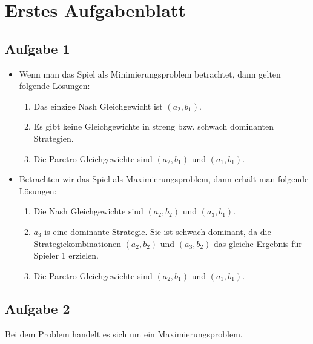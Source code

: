 
\section*{Erstes Aufgabenblatt}
\subsection*{Aufgabe 1}
\label{sec:Aufgabe 1}
\begin{itemize}
	\item Wenn man das Spiel als Minimierungsproblem betrachtet, dann gelten folgende Lösungen:

		\begin{enumerate}[label=\alph{enumi})]
			\item Das einzige Nash Gleichgewicht ist $(a_2, b_1)$.
			\item Es gibt keine Gleichgewichte in streng bzw. schwach dominanten Strategien.
			\item Die Paretro Gleichgewichte sind $(a_2, b_1)$ und $(a_1, b_1)$.
		\end{enumerate}

	\item Betrachten wir das Spiel als Maximierungsproblem, dann erhält man folgende Lösungen:

		\begin{enumerate}[label=\alph{enumi})]
			\item Die Nash Gleichgewichte sind $(a_2, b_2)$ und $(a_3, b_1)$.
			\item $a_3$ is eine dominante Strategie. Sie ist schwach dominant, da die Strategiekombinationen
				$(a_2, b_2)$ und $(a_3, b_2)$ das gleiche Ergebnis für Spieler 1 erzielen.
			\item Die Paretro Gleichgewichte sind $(a_2, b_1)$ und $(a_1, b_1)$.
		\end{enumerate}
\end{itemize}

\subsection{Aufgabe 2}
\label{sec:Aufgabe 2}

Bei dem Problem handelt es sich um ein Maximierungsproblem.

